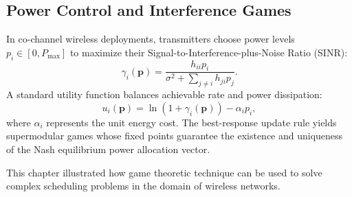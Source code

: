 \subsection{Power Control and Interference Games}
In co-channel wireless deployments, transmitters choose power levels $p_i \in [0, P_{\max}]$ to maximize their Signal-to-Interference-plus-Noise Ratio (SINR):
\begin{equation}
    \gamma_i(\mathbf{p}) = \frac{h_{ii} p_i}{\sigma^2 + \sum_{j \neq i} h_{ji} p_j}.
\end{equation}
A standard utility function balances achievable rate and power dissipation:
\begin{equation}
    u_i(\mathbf{p}) = \ln(1 + \gamma_i(\mathbf{p})) - \alpha_i p_i,
\end{equation}
where $\alpha_i$ represents the unit energy cost. The best-response update rule yields supermodular games whose fixed points guarantee the existence and uniqueness of the Nash equilibrium power allocation vector.

This chapter illustrated how game theoretic technique can be used to solve complex scheduling problems in the domain of wireless networks.
